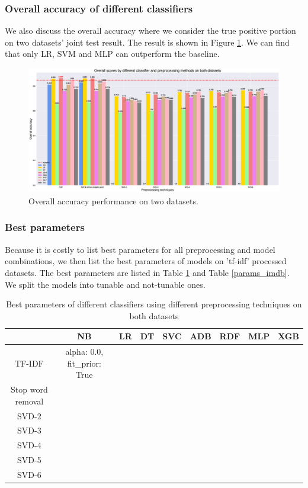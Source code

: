 \documentclass[11pt]{scrartcl}
\begin{document}
\subsubsection*{Overall accuracy of different classifiers}
We also discuss the overall accuracy where we consider the true positive portion on two datasets' joint test result. The result is shown in Figure \ref{overall_accuracy}. We can find that only LR, SVM and MLP can outperform the baseline.

\begin{figure}[H]
	\centering
	\includegraphics[width=\linewidth]{fig/model_acc_overall.eps}
	\caption{Overall accuracy performance on two datasets.}
	\label{overall_accuracy}
\end{figure}

\subsubsection*{Best parameters}
Because it is costly to list best parameters for all preprocessing and model combinations, we then list the best parameters of models on 'tf-idf' processed datasets. The best parameters are listed in Table \ref{params} and Table \ref{params_imdb}. We split the models into tunable and not-tunable ones.

\begin{table}[H]
    \centering
    \begin{tabular}{c|cccccccc}
        \hline
         & NB   & LR & DT & SVC & ADB & RDF & MLP & XGB \\
        \hline
        TF-IDF & alpha: 0.0, fit\_prior: True & & & & & & & \\
		Stop word removal & & & & & & & & \\
		SVD-2 & & & & & & & & \\
		SVD-3 & & & & & & & & \\
		SVD-4 & & & & & & & & \\
		SVD-5 & & & & & & & & \\
		SVD-6 & & & & & & & & \\
        \hline
    \end{tabular} 
    \caption{Best parameters of different classifiers using different preprocessing techniques on both datasets}
    \label{params}
\end{table}
\end{document}
